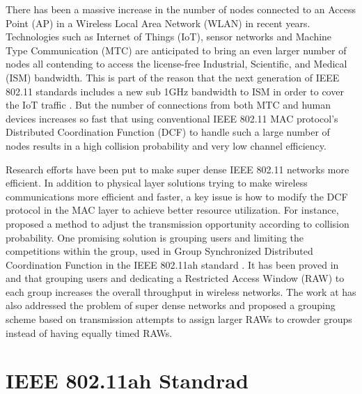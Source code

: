 \label{chapter:single}

There has been a massive increase in the number of nodes connected to an Access Point (AP) in a Wireless Local Area Network (WLAN) in recent years. Technologies such as Internet of Things (IoT), sensor networks and Machine Type Communication (MTC) are anticipated to bring an even larger number of nodes all contending to access the license-free Industrial, Scientific, and Medical (ISM) bandwidth. This is part of the reason that the next generation of IEEE 802.11 standards includes a new sub 1GHz bandwidth to ISM in order to cover the IoT traffic \cite{Req80211ah}. But the number of connections from both MTC and human devices increases so fast that using conventional IEEE 802.11 MAC protocol's Distributed Coordination Function (DCF) to handle such a large number of nodes results in a high collision probability and very low channel efficiency.

Research efforts have been put to make super dense IEEE 802.11 networks more efficient. In addition to physical layer solutions trying to make wireless communications more efficient and faster, a key issue is how to modify the DCF protocol in the MAC layer to achieve better resource utilization. For instance, \cite{zhong2014dcf} proposed a method to adjust the transmission opportunity according to collision probability. One promising solution is grouping users and limiting the competitions within the group, used in Group Synchronized Distributed Coordination Function in the IEEE 802.11ah standard \cite{Draft80211ah}. It has been proved in \cite{zheng2014performance} and \cite{raeesi2014performance} that grouping users and dedicating a Restricted Access Window (RAW) to each group increases the overall throughput in wireless networks. The work at \cite{kim2015optimal} has also addressed the problem of super dense networks and proposed a grouping scheme based on transmission attempts to assign larger RAWs to crowder groups instead of having equally timed RAWs. 


\section{IEEE 802.11ah Standrad}


